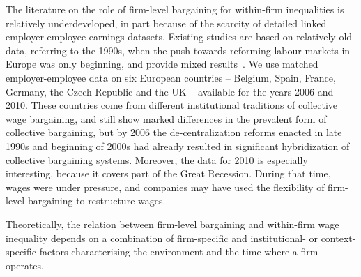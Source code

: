 \documentclass[Review,times,sageh,11pt]{sagej}
\begin{document}
The literature on the role of firm-level bargaining for within-firm inequalities is relatively underdeveloped, in part because of the scarcity of detailed linked employer-employee earnings datasets. Existing studies are based on relatively old data, referring to the 1990s, when the push towards reforming labour markets in Europe was only beginning, and provide mixed results~\citep{dellaringa.lucifora.1994,dellaringa.lucifora.ea.2004, canaldominguez.gutierrez.2004}.
We use matched employer-employee data on six European countries -- Belgium, Spain, France, Germany, the Czech Republic and the UK -- available for the years 2006 and 2010. These countries come from different institutional traditions of collective wage bargaining, and still show marked differences in the prevalent form of collective bargaining, but by 2006 the de-centralization reforms enacted in late 1990s and beginning of 2000s had already resulted in significant hybridization of collective bargaining systems. Moreover, the data for 2010 is especially interesting, because it covers part of the Great Recession. During that time, wages were under pressure, and companies may have used the flexibility of firm-level bargaining to restructure wages.

Theoretically, the relation between firm-level bargaining and within-firm wage inequality depends on a combination of firm-specific and institutional- or context-specific factors characterising the environment and the time where a firm operates. 
\end{document}
